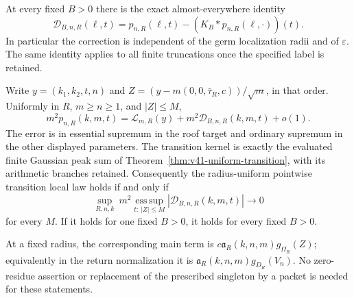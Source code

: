 \begin{theorem}
\label{thm:v43-arithmetic-raw-criterion}
At every fixed $B>0$ there is the exact almost-everywhere identity
\begin{equation}\label{eq:v43-correction-identity}
 \mathscr D_{B,n,R}(\ell,t)
       =p_{n,R}(\ell,t)-(K_B*p_{n,R}(\ell,\cdot))(t).
\end{equation}
In particular the correction is independent of the germ localization
radii and of $\varepsilon$. The same identity applies to all finite
truncations once the specified label is retained.

Write $y=(k_1,k_2,t,n)$ and
$Z=(y-m(0,0,\bar\tau_R,c))/\sqrt m$, in that order. Uniformly in
$R$, $m\ge n\ge1$, and $|Z|\le M$,
\begin{equation}\label{eq:v43-arithmetic-raw-decomposition}
 m^2p_{n,R}(k,m,t)
   =\mathcal L_{m,R}(y)+m^2\mathscr D_{B,n,R}(k,m,t)+o(1).
\end{equation}
The error is in essential supremum in the roof target and ordinary
supremum in the other displayed parameters. The transition kernel is
exactly the evaluated finite Gaussian peak sum of
Theorem~\ref{thm:v41-uniform-transition}, with its arithmetic branches
retained. Consequently the radius-uniform pointwise transition local
law holds if and only if
\begin{equation}\label{eq:v43-single-remainder-criterion}
 \sup_{R,n,k}\ m^2\operatorname*{ess\,sup}_{t:\ |Z|\le M}
                          |\mathscr D_{B,n,R}(k,m,t)|\longrightarrow0
\end{equation}
for every $M$. If it holds for one fixed $B>0$, it holds for every
fixed $B>0$.

At a fixed radius, the corresponding main term is
$c\mathfrak a_R(k,n,m)g_{\Omega_R}(Z)$; equivalently in the return
normalization it is
$\mathfrak a_R(k,n,m)g_{D_R}(V_n)$. No zero-residue assertion or
replacement of the prescribed singleton by a packet is needed for
these statements.
\end{theorem}

